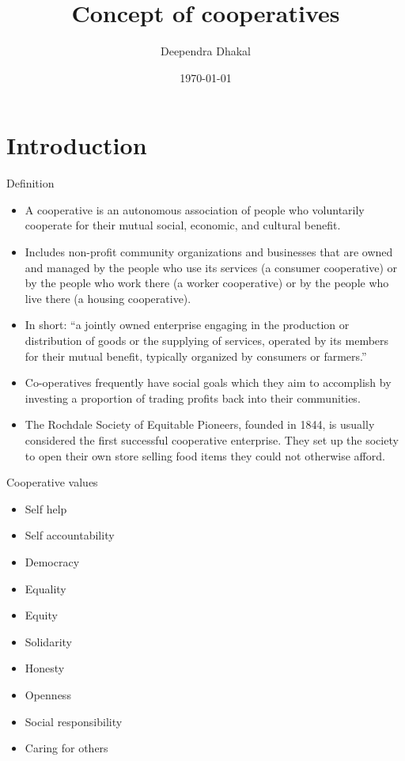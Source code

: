\documentclass[12pt,ignorenonframetext,aspectratio=169]{beamer}
\title{\insertsectionhead}
  {
    \definecolor{white}{rgb}{0.776,0.357,0.157}
    \definecolor{iqss@orange}{rgb}{1,1,1}
    \ifnum \insertmainframenumber > \insertframenumber
    \frame{
      \frametitle{\iqsssectiontitleheader}
      \tableofcontents[currentsection]
    }
    \else
    \frame{
      \frametitle{Backup Slides}
      \tableofcontents[sectionstyle=shaded/shaded,subsectionstyle=shaded/shaded/shaded]
    }
    \fi
  }
\title[]{Concept of cooperatives}
\author[
        Deependra Dhakal
    ]{Deependra Dhakal}
\institute[
    ]{
    GAASC, Baitadi \and Tribhuwan University
    }
\date[
      \today
  ]{
      \today
        }
\providecommand{\tightlist}{%
  \setlength{\itemsep}{0pt}\setlength{\parskip}{0pt}}
\begin{document}
  \begin{frame}[plain]
  \titlepage
  \end{frame}



\hypertarget{introduction}{%
\section{Introduction}\label{introduction}}

\begin{frame}{Definition}
\protect\hypertarget{definition}{}
\begin{itemize}
\tightlist
\item
  A cooperative is an autonomous association of people who voluntarily
  cooperate for their mutual social, economic, and cultural benefit.
\item
  Includes non-profit community organizations and businesses that are
  owned and managed by the people who use its services (a consumer
  cooperative) or by the people who work there (a worker cooperative) or
  by the people who live there (a housing cooperative).
\item
  In short: ``a jointly owned enterprise engaging in the production or
  distribution of goods or the supplying of services, operated by its
  members for their mutual benefit, typically organized by consumers or
  farmers.''
\item
  Co-operatives frequently have social goals which they aim to
  accomplish by investing a proportion of trading profits back into
  their communities.
\item
  The Rochdale Society of Equitable Pioneers, founded in 1844, is
  usually considered the first successful cooperative enterprise. They
  set up the society to open their own store selling food items they
  could not otherwise afford.
\end{itemize}
\end{frame}

\begin{frame}{Cooperative values}
\protect\hypertarget{cooperative-values}{}
\begin{itemize}
\tightlist
\item
  Self help
\item
  Self accountability
\item
  Democracy
\item
  Equality
\item
  Equity
\item
  Solidarity
\item
  Honesty
\item
  Openness
\item
  Social responsibility
\item
  Caring for others
\end{itemize}
\end{frame}
\end{document}
